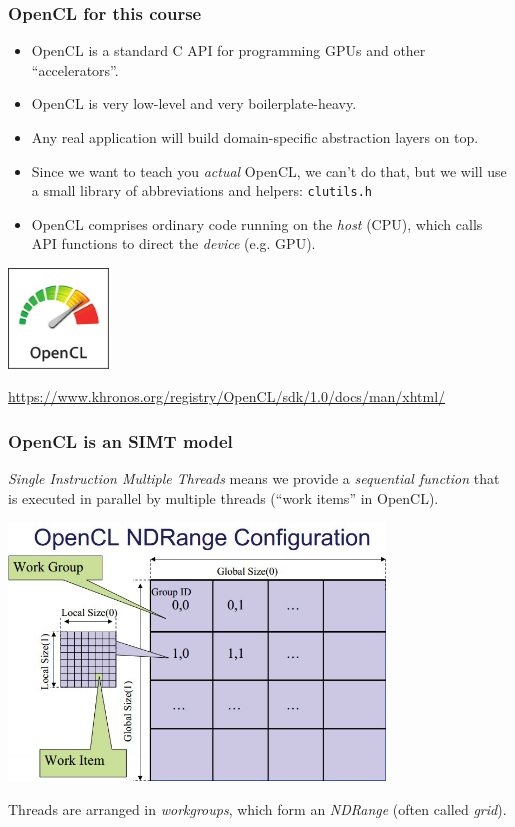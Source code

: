 \documentclass{beamer}
\begin{document}
\begin{frame}
  \frametitle{OpenCL for this course}

  \begin{itemize}
  \item OpenCL is a standard C API for programming GPUs and other
    ``accelerators''.
  \item OpenCL is very low-level and very boilerplate-heavy.
  \item Any real application will build domain-specific abstraction
    layers on top.
  \item Since we want to teach you \textit{actual} OpenCL, we can't do
    that, but we will use a small library of abbreviations and
    helpers: \texttt{clutils.h}
  \item OpenCL comprises ordinary code running on the \textit{host}
    (CPU), which calls API functions to direct the \textit{device}
    (e.g. GPU).
  \end{itemize}

  \bigskip

  \hfill\includegraphics[width=0.2\textwidth]{img/opencl-logo.png}

  \url{https://www.khronos.org/registry/OpenCL/sdk/1.0/docs/man/xhtml/}

\end{frame}

\begin{frame}
  \frametitle{OpenCL is an SIMT model}

  \textit{Single Instruction Multiple Threads} means we provide a
  \textit{sequential function} that is executed in parallel by
  multiple threads (``work items'' in OpenCL).

  \begin{center}
    \includegraphics[width=0.75\textwidth]{img/ndrange.png}
  \end{center}

Threads are arranged in \textit{workgroups}, which form an
\textit{NDRange} (often called \textit{grid}).

\end{frame}
\end{document}
